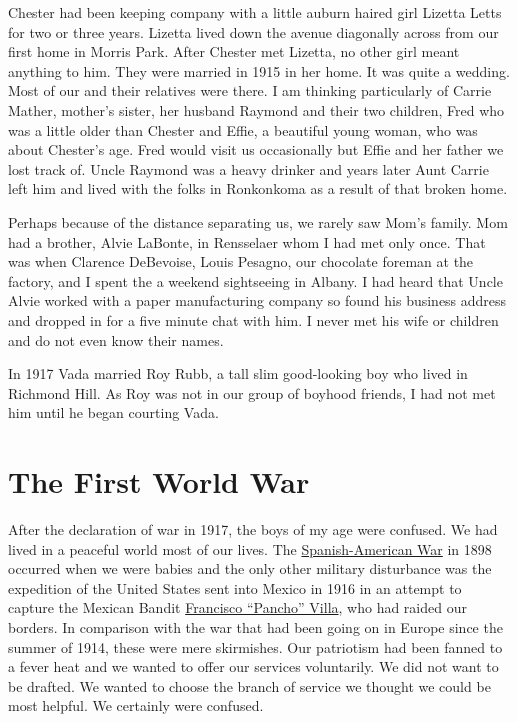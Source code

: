 \documentclass[12pt]{book}              %
\begin{document}
Chester had been keeping company with a little auburn haired girl Lizetta Letts for two or three years. Lizetta lived down the avenue diagonally across from our first home in Morris Park. After Chester met Lizetta, no other girl meant anything to him. They were married in 1915 in her home. It was quite a wedding. Most of our and their relatives were there. I am thinking particularly of Carrie Mather, mother's sister, her husband Raymond and their two children, Fred who was a little older than Chester and Effie, a beautiful young woman, who was about Chester's age. Fred would visit us occasionally but Effie and her father we lost track of. Uncle Raymond was a heavy drinker and years later Aunt Carrie left him and lived with the folks in Ronkonkoma as a result of that broken home. 

Perhaps because of the distance separating us, we rarely saw Mom's family. Mom had a brother, Alvie LaBonte, in Rensselaer whom I had met only once. That was when Clarence DeBevoise, Louis Pesagno, our chocolate foreman at the factory, and I spent the a weekend sightseeing in Albany. I had heard that Uncle Alvie worked with a paper manufacturing company so found his business address and dropped in for a five minute chat with him. I never met his wife or children and do not even know their names.

In 1917 Vada married Roy Rubb, a tall slim good-looking boy who lived in Richmond Hill. As Roy was not in our group of boyhood friends, I had not met him until he began courting Vada.

\chapter{The First World War}

After the declaration of war in 1917, the boys of my age were confused. We had lived in a peaceful world most of our lives. The \href{http://en.wikipedia.org/wiki/Spanish-American_War}{Spanish-American War} in 1898 occurred when we were babies and the only other military disturbance was the expedition of the United States sent into Mexico in 1916 in an attempt to capture the Mexican Bandit \href{http://en.wikipedia.org/wiki/Pancho_Villa}{Francisco ``Pancho'' Villa}, who had raided our borders. In comparison with the war that had been going on in Europe since the summer of 1914, these were mere skirmishes. Our patriotism had been fanned to a fever heat and we wanted to offer our services voluntarily. We did not want to be drafted. We wanted to choose the branch of service we thought we could be most helpful. We certainly were confused. 
\end{document}

